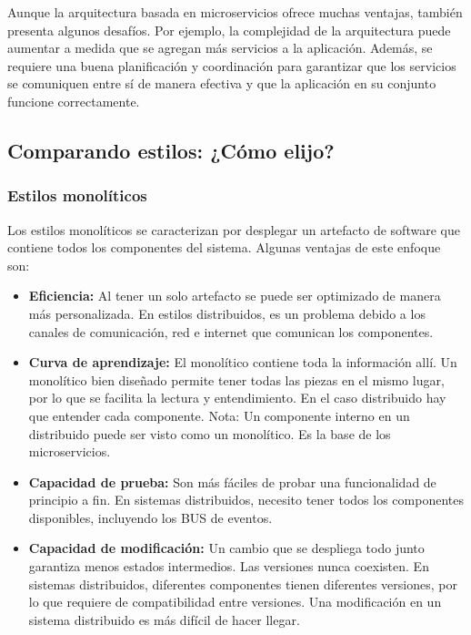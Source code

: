 \documentclass[executivepaper]{article}
\begin{document}
Aunque la arquitectura basada en microservicios ofrece muchas ventajas, también presenta algunos desafíos. Por ejemplo, la complejidad de la arquitectura puede aumentar a medida que se agregan más servicios a la aplicación. Además, se requiere una buena planificación y coordinación para garantizar que los servicios se comuniquen entre sí de manera efectiva y que la aplicación en su conjunto funcione correctamente.

\subsection*{Comparando estilos: ¿Cómo elijo?}

\subsubsection*{Estilos monolíticos}

Los estilos monolíticos se caracterizan por desplegar un artefacto de software que contiene todos los componentes del sistema. Algunas ventajas de este enfoque son:

\begin{itemize}
\item \textbf{Eficiencia:} Al tener un solo artefacto se puede ser optimizado de manera más personalizada. En estilos distribuidos, es un problema debido a los canales de comunicación, red e internet que comunican los componentes.
\item \textbf{Curva de aprendizaje:} El monolítico contiene toda la información allí. Un monolítico bien diseñado permite tener todas las piezas en el mismo lugar, por lo que se facilita la lectura y entendimiento. En el caso distribuido hay que entender cada componente. Nota: Un componente interno en un distribuido puede ser visto como un monolítico. Es la base de los microservicios.
\item \textbf{Capacidad de prueba:} Son más fáciles de probar una funcionalidad de principio a fin. En sistemas distribuidos, necesito tener todos los componentes disponibles, incluyendo los BUS de eventos.
\item \textbf{Capacidad de modificación:} Un cambio que se despliega todo junto garantiza menos estados intermedios. Las versiones nunca coexisten. En sistemas distribuidos, diferentes componentes tienen diferentes versiones, por lo que requiere de compatibilidad entre versiones. Una modificación en un sistema distribuido es más difícil de hacer llegar.
\end{itemize}
\end{document}

